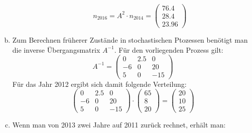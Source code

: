 \begin{exercise}
\begin{enumerate}[a)]
\begin{equation*}
              \qquad
              n_{2016}=A^2\cdot n_{2014}=
              \begin{pmatrix}
                \num{76.4}  \\
                \num{28.4}  \\
                \num{23.96}
              \end{pmatrix}
            \end{equation*}
      \item Zum Berechnen früherer Zustände
            in stochastischen Ptozessen
            benötigt man die inverse
            Übergangsmatrix $A^{-1}$.
            Für den vorliegenden Prozess gilt:
            \begin{equation*}
              A^{-1}=
              \begin{pmatrix}
                \num{0}  & \num{2.5} & \num{0}   \\
                -\num{6} & \num{0}   & \num{20}  \\
                \num{5}  & \num{0}   & -\num{15}
              \end{pmatrix}
            \end{equation*}
            Für das Jahr 2012 ergibt sich damit
            folgende Verteilung:
            \begin{equation*}
              \begin{pmatrix}
                \num{0}  & \num{2.5} & \num{0}   \\
                -\num{6} & \num{0}   & \num{20}  \\
                \num{5}  & \num{0}   & -\num{15}
              \end{pmatrix}
              \cdot
              \begin{pmatrix}
                \num{65} \\
                \num{8}  \\
                \num{20}
              \end{pmatrix}
              =
              \begin{pmatrix}
                \num{20} \\
                \num{10} \\
                \num{25}
              \end{pmatrix}
            \end{equation*}
      \item Wenn man von 2013 zwei Jahre auf 2011
            zurück rechnet, erhält man:
            \begin{equation*}

\end{equation*}
\end{enumerate}
\end{exercise}
